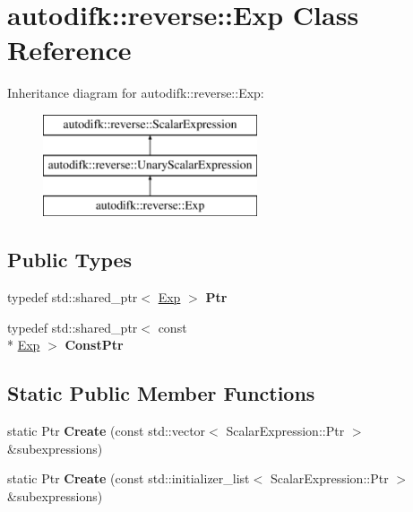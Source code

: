 \hypertarget{classautodifk_1_1reverse_1_1_exp}{\section{autodifk\-:\-:reverse\-:\-:Exp Class Reference}
\label{classautodifk_1_1reverse_1_1_exp}
}
Inheritance diagram for autodifk\-:\-:reverse\-:\-:Exp\-:\begin{figure}[H]
\begin{center}
\leavevmode
\includegraphics[height=3.000000cm]{classautodifk_1_1reverse_1_1_exp}
\end{center}
\end{figure}
\subsection*{Public Types}
\begin{DoxyCompactItemize}
\item 
\hypertarget{classautodifk_1_1reverse_1_1_exp_af6d692f52fd7e5ee8d7f1327823a3c1e}{typedef std\-::shared\-\_\-ptr$<$ \hyperlink{classautodifk_1_1reverse_1_1_exp}{Exp} $>$ {\bfseries Ptr}}\label{classautodifk_1_1reverse_1_1_exp_af6d692f52fd7e5ee8d7f1327823a3c1e}

\item 
\hypertarget{classautodifk_1_1reverse_1_1_exp_a78c046db213cc7a3ae0096a9de90a404}{typedef std\-::shared\-\_\-ptr$<$ const \\*
\hyperlink{classautodifk_1_1reverse_1_1_exp}{Exp} $>$ {\bfseries Const\-Ptr}}\label{classautodifk_1_1reverse_1_1_exp_a78c046db213cc7a3ae0096a9de90a404}

\end{DoxyCompactItemize}
\subsection*{Static Public Member Functions}
\begin{DoxyCompactItemize}
\item 
\hypertarget{classautodifk_1_1reverse_1_1_exp_af5c2b6af4679ec28449e6848a5749475}{static Ptr {\bfseries Create} (const std\-::vector$<$ Scalar\-Expression\-::\-Ptr $>$ \&subexpressions)}\label{classautodifk_1_1reverse_1_1_exp_af5c2b6af4679ec28449e6848a5749475}

\item 
\hypertarget{classautodifk_1_1reverse_1_1_exp_afb7c484df35a50d20c8533f7eafccbb2}{static Ptr {\bfseries Create} (const std\-::initializer\-\_\-list$<$ Scalar\-Expression\-::\-Ptr $>$ \&subexpressions)}\label{classautodifk_1_1reverse_1_1_exp_afb7c484df35a50d20c8533f7eafccbb2}

\end{DoxyCompactItemize}
